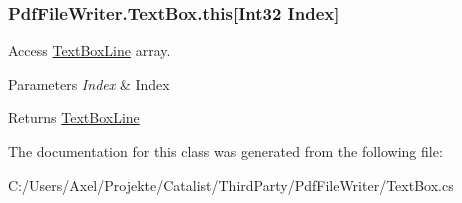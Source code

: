 \subsubsection[{\texorpdfstring{this[Int32 Index]}{this[Int32 Index]}}]{ Pdf\+File\+Writer.\+Text\+Box.\+this\mbox{[}Int32 Index\mbox{]}\hspace{0.3cm}{\ttfamily [get]}}\hypertarget{class_pdf_file_writer_1_1_text_box_af34acbe1db9d16383f247db5f3354402}{}\label{class_pdf_file_writer_1_1_text_box_af34acbe1db9d16383f247db5f3354402}


Access \hyperlink{class_pdf_file_writer_1_1_text_box_line}{Text\+Box\+Line} array. 


\begin{DoxyParams}{Parameters}
{\em Index} & Index\\
\hline
\end{DoxyParams}
\begin{DoxyReturn}{Returns}
\hyperlink{class_pdf_file_writer_1_1_text_box_line}{Text\+Box\+Line}
\end{DoxyReturn}


The documentation for this class was generated from the following file\+:\begin{DoxyCompactItemize}
\item 
C\+:/\+Users/\+Axel/\+Projekte/\+Catalist/\+Third\+Party/\+Pdf\+File\+Writer/Text\+Box.\+cs\end{DoxyCompactItemize}
